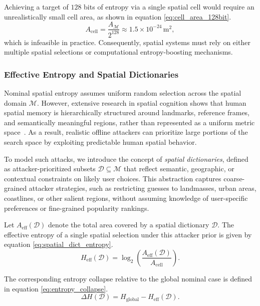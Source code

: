 \documentclass[journal,article,accept,pdftex,moreauthors]{Definitions/mdpi}
\begin{document}
Achieving a target of $128$ bits of entropy via a single spatial cell would require an unrealistically small cell area, as shown in equation \ref{eq:cell_area_128bit}.
\begin{equation}
A_{\text{cell}} = \frac{A_{\mathcal{M}}}{2^{128}} \approx 1.5 \times 10^{-24}\,\text{m}^2,
\label{eq:cell_area_128bit}
\end{equation}
which is infeasible in practice. Consequently, spatial systems must rely on either multiple spatial selections or computational entropy-boosting mechanisms.


\subsubsection{Effective Entropy and Spatial Dictionaries}

Nominal spatial entropy assumes uniform random selection across the spatial domain $\mathcal{M}$. However, extensive research in spatial cognition shows that human spatial memory is hierarchically structured around landmarks, reference frames, and semantically meaningful regions, rather than represented as a uniform metric space~\cite{Montello1998,McNamara2012}. As a result, realistic offline attackers can prioritize large portions of the search space by exploiting predictable human spatial behavior.

To model such attacks, we introduce the concept of \emph{spatial dictionaries}, defined as attacker-prioritized subsets $\mathcal{D} \subseteq \mathcal{M}$ that reflect semantic, geographic, or contextual constraints on likely user choices. This abstraction captures coarse-grained attacker strategies, such as restricting guesses to landmasses, urban areas, coastlines, or other salient regions, without assuming knowledge of user-specific preferences or fine-grained popularity rankings.

Let $A_{\text{eff}}(\mathcal{D})$ denote the total area covered by a spatial dictionary $\mathcal{D}$. The effective entropy of a single spatial selection under this attacker prior is given by equation \ref{eq:spatial_dict_entropy}.
\begin{equation}
H_{\text{eff}}(\mathcal{D}) = \log_2\!\left(\frac{A_{\text{eff}}(\mathcal{D})}{A_{\text{cell}}}\right).
\label{eq:spatial_dict_entropy}
\end{equation}

The corresponding entropy collapse relative to the global nominal case is defined in equation \ref{eq:entropy_collapse}.
\begin{equation}
\Delta H(\mathcal{D}) = H_{\text{global}} - H_{\text{eff}}(\mathcal{D}).
\label{eq:entropy_collapse}
\end{equation}
\end{document}
